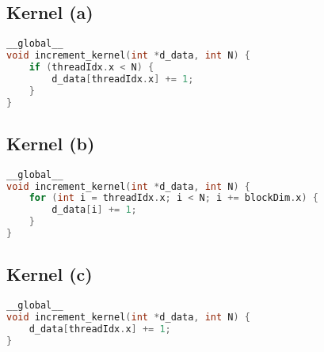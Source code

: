 \documentclass[]{article}
\begin{document}
\subsection{Kernel (a)}
\begin{tcolorbox}[left=14pt, arc=0pt, outer arc=0pt, colframe=blue!5, colback=yellow!5]
\begin{lstlisting}[language=C]
__global__
void increment_kernel(int *d_data, int N) {
    if (threadIdx.x < N) {
        d_data[threadIdx.x] += 1;
    }
}
\end{lstlisting}
\end{tcolorbox}

%
%
%
%

\subsection{Kernel (b)}
\begin{tcolorbox}[left=14pt, arc=0pt, outer arc=0pt, colframe=blue!5, colback=yellow!5]
\begin{lstlisting}[language=C]
__global__
void increment_kernel(int *d_data, int N) {
    for (int i = threadIdx.x; i < N; i += blockDim.x) {
        d_data[i] += 1;
    }
}
\end{lstlisting}
\end{tcolorbox}

%
%
%
%

\subsection{Kernel (c)}
\begin{tcolorbox}[left=14pt, arc=0pt, outer arc=0pt, colframe=blue!5, colback=yellow!5]
\begin{lstlisting}[language=C]
__global__
void increment_kernel(int *d_data, int N) {
    d_data[threadIdx.x] += 1;
}
\end{lstlisting}
\end{tcolorbox}
\end{document}
